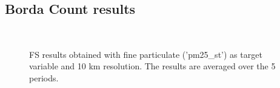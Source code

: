 \subsection{Borda Count results}
\begin{figure}[H]
\centering
{}\\
\caption{FS results obtained with fine particulate ('pm25\_st') as target variable and 10 km resolution. The results are averaged over the 5 periods. }
\end{figure}
